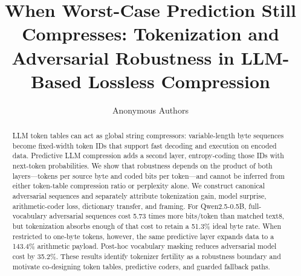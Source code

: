 \documentclass{article}
\title{When Worst-Case Prediction Still Compresses: Tokenization and Adversarial Robustness in LLM-Based Lossless Compression}
\author{Anonymous Authors}
\begin{document}
\maketitle

\begin{abstract}
LLM token tables can act as global string compressors: variable-length byte
sequences become fixed-width token IDs that support fast decoding and execution
on encoded data. Predictive LLM compression adds a second layer, entropy-coding
those IDs with next-token probabilities. We show that robustness depends on the
product of both layers---tokens per source byte and coded bits per token---and
cannot be inferred from either token-table compression ratio or perplexity alone.
We construct canonical adversarial sequences and separately attribute
tokenization gain, model surprise, arithmetic-coder loss, dictionary transfer,
and framing. For Qwen2.5-0.5B, full-vocabulary adversarial sequences cost 5.73
times more bits/token than matched text8, but tokenization absorbs enough of that
cost to retain a 51.3\% ideal byte rate. When restricted to one-byte tokens,
however, the same predictive layer expands data to a 143.4\% arithmetic payload.
Post-hoc vocabulary masking reduces adversarial model cost by 35.2\%. These
results identify tokenizer fertility as a robustness boundary and motivate
co-designing token tables, predictive coders, and guarded fallback paths.
\end{abstract}

%
%
\end{document}
